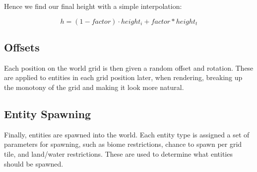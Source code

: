 \documentclass{article}
\begin{document}
\begin{multicols}{2}
        Hence we find our final height with a simple interpolation:

        \[
            h = (1 - factor) \cdot height_i + factor * height_t
        \]
        
        \subsection{Offsets}
        
        Each position on the world grid is then given a random offset and rotation. These are applied to entities in each grid position later, when rendering, breaking up the monotony of the grid and making it look more natural.
        
        \subsection{Entity Spawning}
        
        Finally, entities are spawned into the world. Each entity type is assigned a set of parameters for spawning, such as biome restrictions, chance to spawn per grid tile, and land/water restrictions. These are used to determine what entities should be spawned.
        

    \end{multicols}

    \newpage
    
\end{document}
